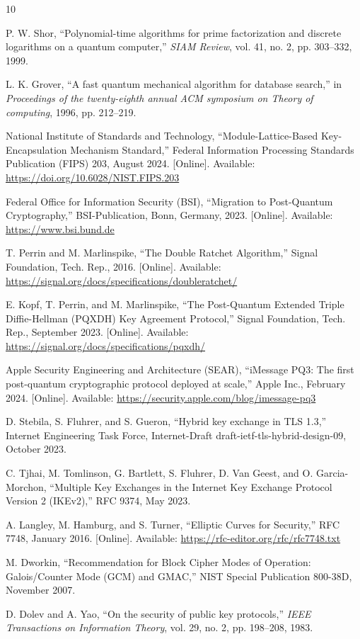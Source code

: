 \begin{thebibliography}{10}

P. W. Shor, ``Polynomial-time algorithms for prime factorization and discrete logarithms on a quantum computer,'' \textit{SIAM Review}, vol. 41, no. 2, pp. 303--332, 1999.

L. K. Grover, ``A fast quantum mechanical algorithm for database search,'' in \textit{Proceedings of the twenty-eighth annual ACM symposium on Theory of computing}, 1996, pp. 212--219.

National Institute of Standards and Technology, ``Module-Lattice-Based Key-Encapsulation Mechanism Standard,'' Federal Information Processing Standards Publication (FIPS) 203, August 2024. [Online]. Available: \url{https://doi.org/10.6028/NIST.FIPS.203}

Federal Office for Information Security (BSI), ``Migration to Post-Quantum Cryptography,'' BSI-Publication, Bonn, Germany, 2023. [Online]. Available: \url{https://www.bsi.bund.de}

T. Perrin and M. Marlinspike, ``The Double Ratchet Algorithm,'' Signal Foundation, Tech. Rep., 2016. [Online]. Available: \url{https://signal.org/docs/specifications/doubleratchet/}

E. Kopf, T. Perrin, and M. Marlinspike, ``The Post-Quantum Extended Triple Diffie-Hellman (PQXDH) Key Agreement Protocol,'' Signal Foundation, Tech. Rep., September 2023. [Online]. Available: \url{https://signal.org/docs/specifications/pqxdh/}

Apple Security Engineering and Architecture (SEAR), ``iMessage PQ3: The first post-quantum cryptographic protocol deployed at scale,'' Apple Inc., February 2024. [Online]. Available: \url{https://security.apple.com/blog/imessage-pq3}

D. Stebila, S. Fluhrer, and S. Gueron, ``Hybrid key exchange in TLS 1.3,'' Internet Engineering Task Force, Internet-Draft draft-ietf-tls-hybrid-design-09, October 2023.

C. Tjhai, M. Tomlinson, G. Bartlett, S. Fluhrer, D. Van Geest, and O. Garcia-Morchon, ``Multiple Key Exchanges in the Internet Key Exchange Protocol Version 2 (IKEv2),'' RFC 9374, May 2023.

A. Langley, M. Hamburg, and S. Turner, ``Elliptic Curves for Security,'' RFC 7748, January 2016. [Online]. Available: \url{https://rfc-editor.org/rfc/rfc7748.txt}

M. Dworkin, ``Recommendation for Block Cipher Modes of Operation: Galois/Counter Mode (GCM) and GMAC,'' NIST Special Publication 800-38D, November 2007.

D. Dolev and A. Yao, ``On the security of public key protocols,'' \textit{IEEE Transactions on Information Theory}, vol. 29, no. 2, pp. 198--208, 1983.

\end{thebibliography}
